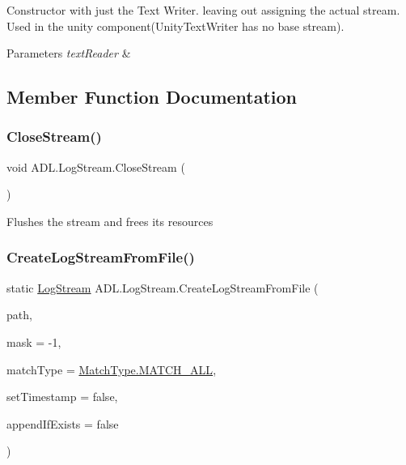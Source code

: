 Constructor with just the Text Writer. leaving out assigning the actual stream. Used in the unity component(\+Unity\+Text\+Writer has no base stream). 


\begin{DoxyParams}{Parameters}
{\em text\+Reader} & \\
\hline
\end{DoxyParams}


\subsection{Member Function Documentation}
\mbox{\label{class_a_d_l_1_1_log_stream_afd62c8127a7d8573621ac0c565ed62ac}} 
\subsubsection{\texorpdfstring{Close\+Stream()}{CloseStream()}}
{\footnotesize\ttfamily void A\+D\+L.\+Log\+Stream.\+Close\+Stream (\begin{DoxyParamCaption}{ }\end{DoxyParamCaption})}



Flushes the stream and frees its resources 

\mbox{\label{class_a_d_l_1_1_log_stream_a5369ad1bfec52a786117832f74454054}} 
\subsubsection{\texorpdfstring{Create\+Log\+Stream\+From\+File()}{CreateLogStreamFromFile()}}
{\footnotesize\ttfamily static \mbox{\hyperlink{class_a_d_l_1_1_log_stream}{Log\+Stream}} A\+D\+L.\+Log\+Stream.\+Create\+Log\+Stream\+From\+File (\begin{DoxyParamCaption}\item[{string}]{path,  }\item[{int}]{mask = {\ttfamily -\/1},  }\item[{\mbox{\hyperlink{namespace_a_d_l_af6334296dbae0383a652317263f0bc05}{Match\+Type}}}]{match\+Type = {\ttfamily \mbox{\hyperlink{namespace_a_d_l_af6334296dbae0383a652317263f0bc05a627c7991c5d0265194247e92fcf120b0}{Match\+Type.\+M\+A\+T\+C\+H\+\_\+\+A\+LL}}},  }\item[{bool}]{set\+Timestamp = {\ttfamily false},  }\item[{bool}]{append\+If\+Exists = {\ttfamily false} }\end{DoxyParamCaption})\hspace{0.3cm}{\ttfamily [static]}}




